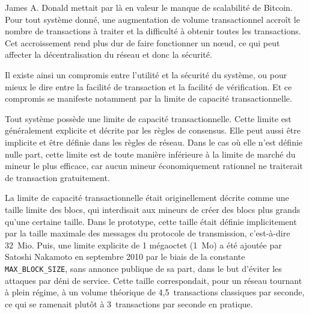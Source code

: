 James A. Donald mettait par là en valeur le manque de scalabilité de Bitcoin. Pour tout système donné, une augmentation de volume transactionnel accroît le nombre de transactions à traiter et la difficulté à obtenir toutes les transactions. Cet accroissement rend plus dur de faire fonctionner un nœud, ce qui peut affecter la décentralisation du réseau et donc la sécurité.

Il existe ainsi un compromis entre l'utilité et la sécurité du système, ou pour mieux le dire entre la facilité de transaction et la facilité de vérification. Et ce compromis se manifeste notamment par la limite de capacité transactionnelle.

Tout système possède une limite de capacité transactionnelle. Cette limite est généralement explicite et décrite par les règles de consensus. Elle peut aussi être implicite et être définie dans les règles de réseau. Dans le cas où elle n'est définie nulle part, cette limite est de toute manière inférieure à la limite de marché du mineur le plus efficace, car aucun mineur économiquement rationnel ne traiterait de transaction gratuitement.

La limite de capacité transactionnelle était originellement décrite comme une taille limite des blocs, qui interdisait aux mineurs de créer des blocs plus grands qu'une certaine taille. Dans le prototype, cette taille était définie implicitement par la taille maximale des messages du protocole de transmission, c'est-à-dire 32~Mio. Puis, une limite explicite de 1 mégaoctet (1~Mo) a été ajoutée par Satoshi Nakamoto en septembre 2010 par le biais de la constante \texttt{MAX\_BLOCK\_SIZE}, sans annonce publique de sa part, dans le but d'éviter les attaques par déni de service. Cette taille correspondait, pour un réseau tournant à plein régime, à un volume théorique de 4,5~transactions classiques par seconde, ce qui se ramenait plutôt à 3~transactions par seconde en pratique. %

